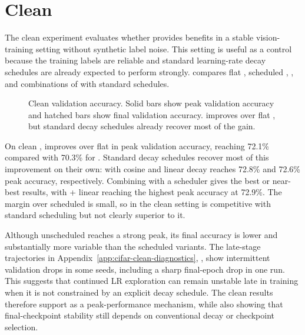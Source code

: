 \section{Clean \cifar{}}
\label{sec:results-cifar-clean}

The clean \cifar{} experiment evaluates whether \method{} provides benefits in a stable vision-training setting without synthetic label noise. This setting is useful as a control because the training labels are reliable and standard learning-rate decay schedules are already expected to perform strongly.  compares flat \adamw{}, scheduled \adamw{}, \method{}, and combinations of \method{} with standard schedules.

\begin{figure}[t]
    \centering
    \caption{
        Clean \cifar{} validation accuracy. Solid bars show peak validation accuracy and hatched bars show final validation accuracy. \method{} improves over flat \adamw{}, but standard decay schedules already recover most of the gain.
    }
    \label{fig:cifar-clean-barplot}
\end{figure}



On clean \cifar{}, \method{} improves over flat \adamw{} in peak validation accuracy, reaching 72.1\% compared with 70.3\% for \adamw{}. Standard decay schedules recover most of this improvement on their own: \adamw{} with cosine and linear decay reaches 72.8\% and 72.6\% peak accuracy, respectively. Combining \method{} with a scheduler gives the best or near-best results, with \method{} + linear reaching the highest peak accuracy at 72.9\%. The margin over scheduled \adamw{} is small, so in the clean setting \method{} is competitive with standard scheduling but not clearly superior to it.

Although unscheduled \method{} reaches a strong peak, its final accuracy is lower and substantially more variable than the scheduled variants. The late-stage trajectories in Appendix~\ref{app:cifar-clean-diagnostics}, , show intermittent validation drops in some seeds, including a sharp final-epoch drop in one run. This suggests that continued LR exploration can remain unstable late in training when it is not constrained by an explicit decay schedule. The clean \cifar{} results therefore support \method{} as a peak-performance mechanism, while also showing that final-checkpoint stability still depends on conventional decay or checkpoint selection.

